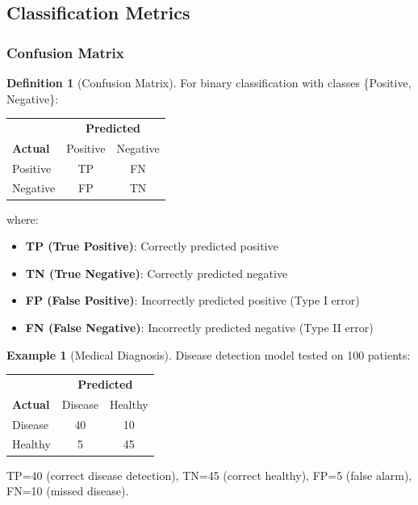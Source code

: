 \documentclass[11pt,twoside]{article}
\numberwithin{equation}{section}
\theoremstyle{plain}
\theoremstyle{definition}
\newtheorem{definition}[theorem]{Definition}
\newtheorem{example}[theorem]{Example}
\theoremstyle{remark}
\begin{document}
\subsection{Classification Metrics}

\subsubsection{Confusion Matrix}

\begin{definition}[Confusion Matrix]
For binary classification with classes \{Positive, Negative\}:

\begin{center}
\begin{tabular}{lcc}
\toprule
& \multicolumn{2}{c}{\textbf{Predicted}} \\
\textbf{Actual} & Positive & Negative \\
\midrule
Positive & TP & FN \\
Negative & FP & TN \\
\bottomrule
\end{tabular}
\end{center}

where:
\begin{itemize}
\item \textbf{TP (True Positive)}: Correctly predicted positive
\item \textbf{TN (True Negative)}: Correctly predicted negative
\item \textbf{FP (False Positive)}: Incorrectly predicted positive (Type I error)
\item \textbf{FN (False Negative)}: Incorrectly predicted negative (Type II error)
\end{itemize}
\end{definition}

\begin{example}[Medical Diagnosis]
Disease detection model tested on 100 patients:
\begin{center}
\begin{tabular}{lcc}
\toprule
& \multicolumn{2}{c}{\textbf{Predicted}} \\
\textbf{Actual} & Disease & Healthy \\
\midrule
Disease & 40 & 10 \\
Healthy & 5 & 45 \\
\bottomrule
\end{tabular}
\end{center}

TP=40 (correct disease detection), TN=45 (correct healthy), FP=5 (false alarm), FN=10 (missed disease).
\end{example}
\end{document}
